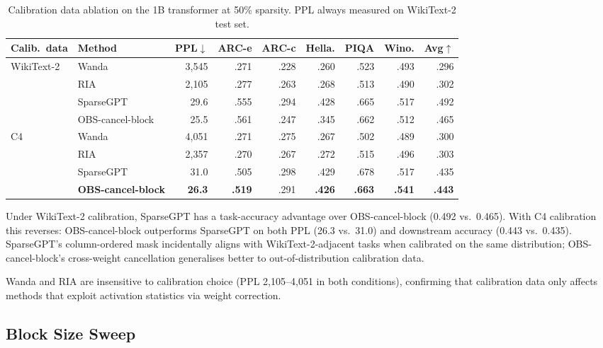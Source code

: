 \documentclass{article}
\begin{document}
\begin{table}[htbp]
  \centering
  \caption{%
    Calibration data ablation on the 1B transformer at 50\% sparsity.
    PPL always measured on WikiText-2 test set.
  }
  \label{tab:calib}
  \small
  \begin{tabular}{llrrrrrrr}
    \toprule
    Calib.\ data & Method & PPL$\downarrow$ & ARC-e & ARC-c & Hella. & PIQA & Wino. & Avg$\uparrow$ \\
    \midrule
    \multirow{4}{*}{WikiText-2}
      & Wanda            & 3{,}545 & .271 & .228 & .260 & .523 & .493 & .296 \\
      & RIA              & 2{,}105 & .277 & .263 & .268 & .513 & .490 & .302 \\
      & SparseGPT        &    29.6 & .555 & .294 & .428 & .665 & .517 & .492 \\
      & OBS-cancel-block &    25.5 & .561 & .247 & .345 & .662 & .512 & .465 \\
    \midrule
    \multirow{4}{*}{C4}
      & Wanda            & 4{,}051 & .271 & .275 & .267 & .502 & .489 & .300 \\
      & RIA              & 2{,}357 & .270 & .267 & .272 & .515 & .496 & .303 \\
      & SparseGPT        &    31.0 & .505 & .298 & .429 & .678 & .517 & .435 \\
      & \textbf{OBS-cancel-block} & \textbf{26.3} & \textbf{.519} & .291 & \textbf{.426} & \textbf{.663} & \textbf{.541} & \textbf{.443} \\
    \bottomrule
  \end{tabular}
\end{table}

Under WikiText-2 calibration, SparseGPT has a task-accuracy advantage over
OBS-cancel-block (0.492 vs.\ 0.465). With C4 calibration this reverses:
OBS-cancel-block outperforms SparseGPT on both PPL (26.3 vs.\ 31.0) and
downstream accuracy (0.443 vs.\ 0.435). SparseGPT's column-ordered mask
incidentally aligns with WikiText-2-adjacent tasks when calibrated on the
same distribution; OBS-cancel-block's cross-weight cancellation generalises
better to out-of-distribution calibration data.

Wanda and RIA are insensitive to calibration choice (PPL 2{,}105--4{,}051 in
both conditions), confirming that calibration data only affects methods that
exploit activation statistics via weight correction.

\subsection{Block Size Sweep}
\label{sec:block_sweep}
\end{document}
